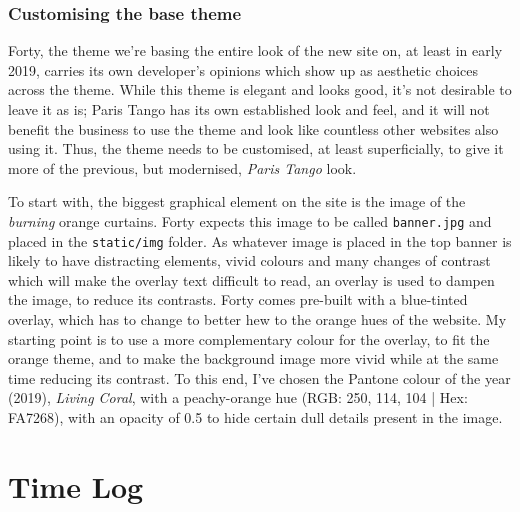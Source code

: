 \documentclass{article}
\begin{document}
\subsubsection{Customising the base theme}
\label{sec:orgf3cd37b}
Forty, the theme we're basing the entire look of the new site on, at least in
early 2019, carries its own developer's opinions which show up as aesthetic
choices across the theme. While this theme is elegant and looks good, it's not
desirable to leave it as is; Paris Tango has its own established look and feel,
and it will not benefit the business to use the theme and look like countless
other websites also using it. Thus, the theme needs to be customised, at least
superficially, to give it more of the previous, but modernised, \emph{Paris Tango}
look.

To start with, the biggest graphical element on the site is the image of the
\emph{burning} orange curtains. Forty expects this image to be called \texttt{banner.jpg}
and placed in the \texttt{static/img} folder. As whatever image is placed in the top
banner is likely to have distracting elements, vivid colours and many changes of
contrast which will make the overlay text difficult to read, an overlay is used
to dampen the image, to reduce its contrasts. Forty comes pre-built with a
blue-tinted overlay, which has to change to better hew to the orange hues of the
website. My starting point is to use a more complementary colour for the
overlay, to fit the orange theme, and to make the background image more vivid
while at the same time reducing its contrast. To this end, I've chosen the
Pantone colour of the year (2019), \emph{Living Coral}, with a peachy-orange hue
(RGB: 250, 114, 104 | Hex: FA7268), with an opacity of 0.5 to hide certain dull
details present in the image.

\section{Time Log}
\label{sec:org3c3927a}
\end{document}

